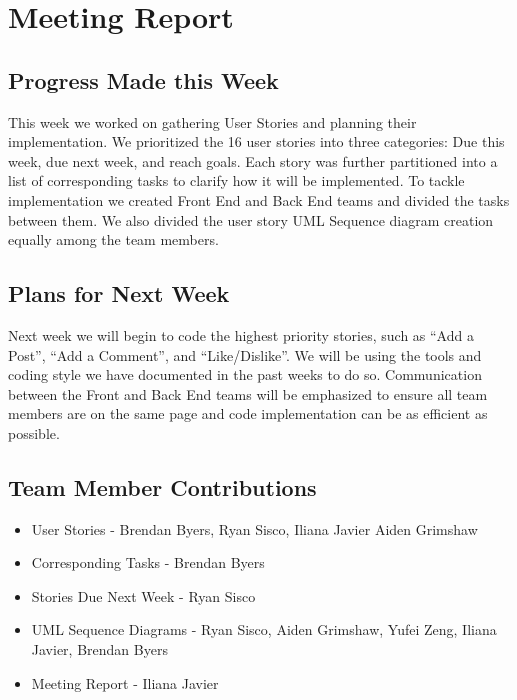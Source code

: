 \documentclass[12pt]{article}
\begin{document}
\section{Meeting Report}

\subsection{Progress Made this Week}

This week we worked on gathering User Stories and planning their implementation.
We prioritized the 16 user stories into three categories: Due this week, due
next week, and reach goals. Each story was further partitioned into a list of
corresponding tasks to clarify how it will be implemented. To tackle
implementation we created Front End and Back End teams and divided the tasks
between them. We also divided the user story UML Sequence diagram creation
equally among the team members.

\subsection{Plans for Next Week}

Next week we will begin to code the highest priority stories, such as “Add a
Post”, “Add a Comment”, and “Like/Dislike”. We will be using the tools and
coding style we have documented in the past weeks to do so. Communication
between the Front and Back End teams will be emphasized to ensure all team
members are on the same page and code implementation can be as efficient as
possible.

\subsection{Team Member Contributions}

\begin{itemize}
  \item User Stories - Brendan Byers, Ryan Sisco, Iliana Javier Aiden Grimshaw
  \item Corresponding Tasks - Brendan Byers
  \item Stories Due Next Week - Ryan Sisco
  \item UML Sequence Diagrams - Ryan Sisco, Aiden Grimshaw, Yufei Zeng, Iliana Javier, Brendan Byers
  \item Meeting Report -  Iliana Javier
\end{itemize}
\end{document}
